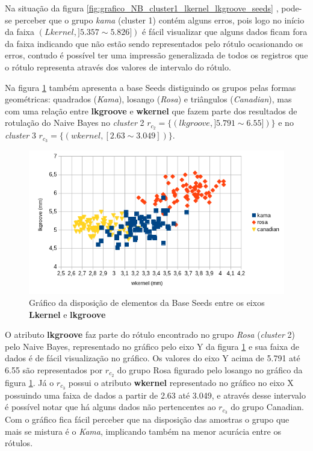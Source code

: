 Na situação da figura \ref{fig:grafico_NB_cluster1_lkernel_lkgroove_seeds} , pode-se perceber que o grupo \textit{kama} (cluster 1) contém alguns erros, pois logo no início da faixa ${ (Lkernel, ] 5.357 \sim  5.826 ]) }$ é fácil visualizar que alguns dados  ficam fora da faixa indicando que não estão sendo representados pelo rótulo ocasionando os erros, contudo é possível ter uma impressão generalizada de todos os registros que o rótulo representa através dos valores de intervalo do rótulo. 

Na figura \ref{fig:grafico_NB_cluster1_2_wkernel_lkgroove_seeds} também apresenta a base Seeds distiguindo os grupos pelas formas geométricas: quadrados (\textit{Kama}), losango (\textit{Rosa}) e triângulos (\textit{Canadian}), mas com uma  relação entre  \textbf{lkgroove} e \textbf{wkernel} que  fazem parte dos resultados de rotulação do Naive Bayes no \textit{cluster} 2 ${r_{c_2}=\{ (lkgroove, ] 5.791 \sim  6.55]) \} }$ e no \textit{cluster} 3 ${r_{c_3}=\{ (wkernel, [2.63 \sim  3.049])\} }$.
 
\begin{figure}[h!]
        \centering
        \includegraphics[scale=0.9]{figs/grafico_NB_cluster1_2_wkernel_lkgroove_seeds.png}
        \caption{Gráfico da disposição de elementos da Base Seeds entre os eixos \textbf{Lkernel} e \textbf{lkgroove}} \label{fig:grafico_NB_cluster1_2_wkernel_lkgroove_seeds}
\end{figure}
 
O atributo \textbf{lkgroove} faz parte do rótulo encontrado no grupo \textit{Rosa} (\textit{cluster} 2) pelo Naive Bayes, representado no gráfico pelo eixo Y da figura \ref{fig:grafico_NB_cluster1_2_wkernel_lkgroove_seeds} e sua faixa de dados é de fácil visualização no gráfico. Os valores do eixo Y acima de 5.791 até 6.55 são representados por ${r_{c_2}}$ do grupo Rosa figurado pelo losango no gráfico da figura \ref{fig:grafico_NB_cluster1_2_wkernel_lkgroove_seeds}. Já o ${r_{c_3}}$ possui o atributo \textbf{wkernel}  representado no gráfico no eixo X possuindo uma faixa de dados a partir de 2.63 até 3.049, e através desse intervalo é possível notar que há alguns dados não pertencentes ao ${r_{c_3}}$ do grupo Canadian. Com o gráfico fica fácil perceber que na disposição das amostras o grupo que mais se mistura  é o \textit{Kama}, implicando também na menor acurácia entre os rótulos. 


